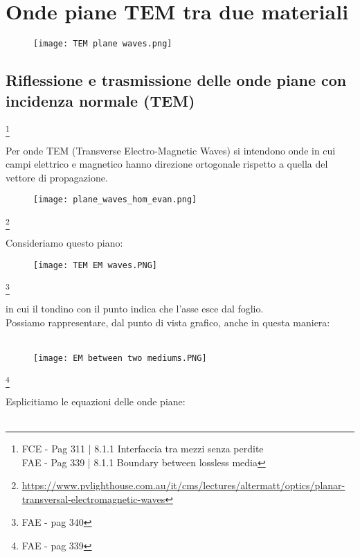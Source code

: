 \chapter{Onde piane TEM tra due materiali} 
\begin{figure}[h]
    \centering
    \texttt{[image: TEM plane waves.png]}
    
\end{figure}    

\newpage

\section{Riflessione e trasmissione delle onde piane con incidenza normale (TEM)}

\footnote{FCE - Pag 311 | 8.1.1 Interfaccia tra mezzi senza perdite \\ 
FAE - Pag 339 | 8.1.1 Boundary between lossless media} 

Per onde TEM (Transverse Electro-Magnetic Waves) si intendono onde in cui campi 
elettrico e magnetico hanno direzione ortogonale rispetto a quella del vettore di propagazione. 

\begin{figure}[h]
    \centering
    \texttt{[image: plane\_waves\_hom\_evan.png]}    
\end{figure}    
\footnote{\url{https://www.pvlighthouse.com.au/it/cms/lectures/altermatt/optics/planar-transversal-electromagnetic-waves}} 


Consideriamo questo piano: 

\begin{figure}[h]
    \centering
    \texttt{[image: TEM EM waves.PNG]}    
\end{figure}    
\footnote{FAE - pag 340}

in cui il tondino con il punto indica che l'asse esce dal foglio. \\

Possiamo rappresentare, dal punto di vista grafico, anche in questa maniera: \\ \\ 

\begin{figure}[h]
    \centering
    \texttt{[image: EM between two mediums.PNG]}    
\end{figure}

\footnote{FAE - pag 339}


Esplicitiamo le equazioni delle onde piane: \\ \\ 

